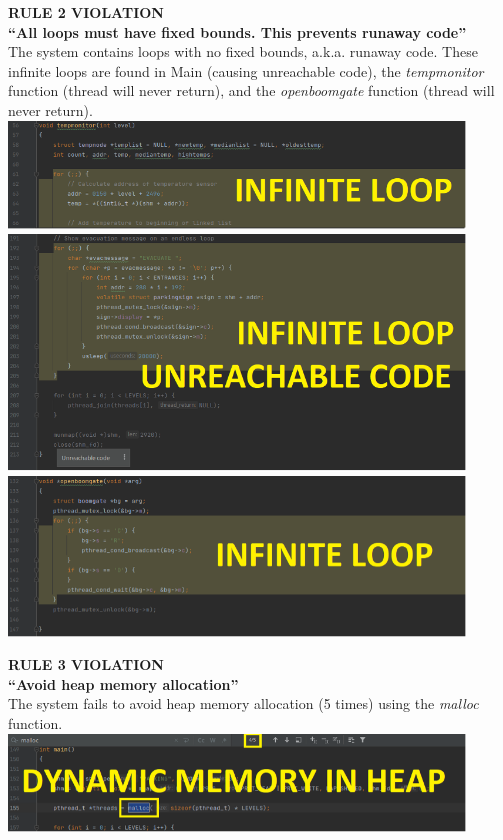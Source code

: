\documentclass[a4paper]{article}
\begin{document}
\newpage
\par \noindent \textbf{RULE 2 VIOLATION\\“All loops must have fixed bounds. This prevents runaway code”} \\[1\baselineskip]
The system contains loops with no fixed bounds, a.k.a. runaway code. These infinite loops are found in Main (causing unreachable code), the \emph{tempmonitor} function (thread will never return), and the \emph{openboomgate} function (thread will never return). \\[1\baselineskip]
\includegraphics[width=12.12cm]{report-img/nasa-rule-2-violation.png}
\\
\includegraphics[width=12.12cm]{report-img/nasa-rule-2-violation-2.png}
\\
\includegraphics[width=12.12cm]{report-img/nasa-rule-2-violation-3.png}

\newpage
\par \noindent \textbf{RULE 3 VIOLATION\\“Avoid heap memory allocation”} \\[1\baselineskip]
The system fails to avoid heap memory allocation (5 times) using the \emph{malloc} function. \\[1\baselineskip]
\includegraphics[width=12.12cm]{report-img/nasa-rule-3-violation.png}
\end{document}
